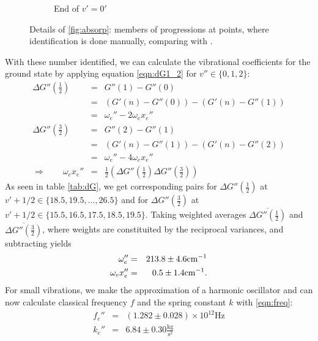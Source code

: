 \begin{figure}
\begin{subfigure}[b]{\mpltw}
        \caption{End of $v'=0'$}
        \label{fig:absorp_detail_03}
    \end{subfigure}
    \caption{Details of \ref{fig:absorp}: members of progressions at points, where 
    identification is done manually, comparing with \cite{staatsexamen}.
    }
    \label{fig:absorp_detail}
\end{figure}

With these number identified, we can calculate the vibrational coefficients for 
the ground state by applying equation \eqref{eqn:dG1_2} for $v'' \in \{0, 1, 2\}$:
\begin{eqnarray}
    \Delta G''\left ( \frac{1}{2} \right ) &=& G''(1) - G''(0) \nonumber\\
        &=& (G'(n) - G''(0)) - (G'(n) - G''(1)) \nonumber \\
        &=& \omega_e'' - 2 \omega_e x_e'' \\
    \Delta G''\left ( \frac{3}{2} \right ) &=& G''(2) - G''(1) \nonumber\\
        &=& (G'(n) - G''(1)) - (G'(n) - G''(2)) \nonumber \\
        &=& \omega_e'' - 4 \omega_e x_e'' \\
  \Rightarrow \qquad  \omega_e x_e'' &=& \frac{1}{2} \left ( \Delta G''\left ( \frac{1}{2} \right ) 
        \Delta G''\left ( \frac{3}{2} \right ) \right )
\end{eqnarray}
As seen in table \ref{tab:dG}, we get corresponding pairs for 
$\Delta G''\left ( \frac{1}{2} \right )$ at $v' + 1/2 \in \{18.5, 19.5, \ldots, 26.5\}$ 
and for 
$\Delta G''\left ( \frac{3}{2} \right )$ at $v' + 1/2 \in \{15.5, 16.5, 17.5, 18.5, 19.5\}$.
Taking weighted averages $\overline{\Delta G''\left ( \frac{1}{2} \right )}$ and 
$\overline{\Delta G''\left ( \frac{3}{2} \right )}$, 
where weights are constituited by the reciprocal variances, and subtracting yields
\begin{eqnarray}
    \omega_e'' &=& 213.8 \pm 4.6 \mathrm{cm^{-1}} \\
    \omega_e x_e'' &=& 0.5 \pm 1.4 \mathrm{cm^{-1}}.
\end{eqnarray}
For small vibrations, we make the approximation of a harmonic oscillator and 
can now calculate classical frequency $f$ and the spring constant $k$ with 
\eqref{eqn:freq}:
\begin{eqnarray}
    f_e'' &=& \left(1.282 \pm 0.028\right) \times 10^{12} \mathrm{Hz} \\
    k_e'' &=& 6.84 \pm 0.30 \mathrm{\frac{kg}{s^2}}
\end{eqnarray}





